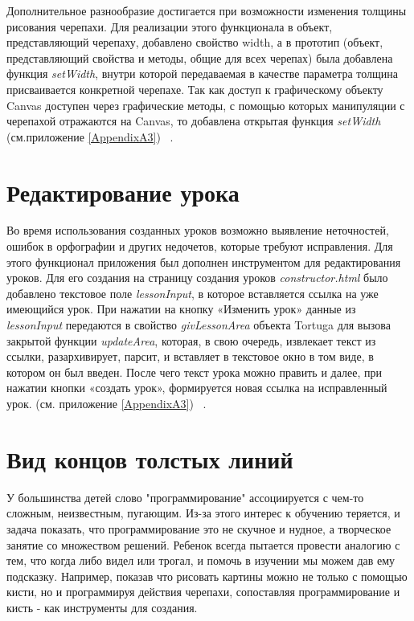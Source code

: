 Дополнительное разнообразие достигается при возможности изменения толщины рисования черепахи. Для реализации этого функционала в объект, представляющий черепаху, добавлено свойство width, а в прототип (объект, представляющий свойства и методы, общие для всех черепах) была добавлена функция \textit{setWidth}, внутри которой передаваемая в качестве параметра толщина присваивается конкретной черепахе. Так как доступ к графическому объекту Canvas доступен через графические методы, с помощью которых манипуляции с черепахой отражаются на Canvas, то добавлена открытая функция \textit{setWidth} (см.приложение \ref{AppendixA3}) ~\cite{prototype}.

\section{Редактирование урока} \label{sect1_1}

Во время использования созданных уроков возможно выявление  неточностей, ошибок в орфографии и других недочетов, которые требуют исправления. Для этого функционал приложения был дополнен инструментом для редактирования уроков. Для его создания на страницу создания уроков \textit{constructor.html} было добавлено текстовое поле \textit{lessonInput}, в которое вставляется ссылка на уже имеющийся урок. При нажатии на кнопку «Изменить урок» данные из \textit{lessonInput} передаются в свойство \textit{givLessonArea} объекта Tortuga для вызова закрытой функции \textit{updateArea}, которая, в свою очередь,  извлекает текст из ссылки, разархивирует, парсит, и вставляет в текстовое окно в том виде, в котором он был введен. После чего текст урока можно править и далее, при нажатии кнопки «создать урок», формируется новая ссылка на исправленный урок. (см. приложение \ref{AppendixA3}) ~\cite{elementsdom, string}.


\section{Вид концов толстых линий} \label{sect1_1}
У большинства детей  слово "программирование" ассоциируется с чем-то сложным, неизвестным, пугающим. Из-за этого интерес к обучению теряется, и задача показать, что программирование это не скучное и нудное, а творческое занятие со множеством решений. Ребенок всегда пытается провести аналогию с тем, что когда либо видел или трогал, и помочь в изучении мы можем дав ему подсказку. Например, показав что рисовать картины можно не только с помощью  кисти, но и программируя действия черепахи, сопоставляя программирование и  кисть -  как инструменты для создания.

